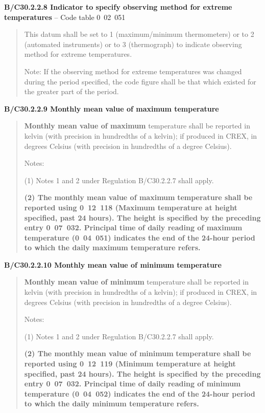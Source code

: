 \textbf{B/C30.2.2.8 Indicator to specify observing method for extreme temperatures} -- Code table 0~02~051

\begin{quote}
This datum shall be set to 1 (maximum/minimum thermometers) or to 2 (automated instruments) or to 3 (thermograph) to indicate observing method for extreme temperatures.

Note: If the observing method for extreme temperatures was changed during the period specified, the code figure shall be that which existed for the greater part of the period.
\end{quote}

\textbf{B/C30.2.2.9 Monthly mean value of maximum temperature}

\begin{quote}
\textbf{Monthly mean value of maximum} temperature shall be reported in kelvin (with precision in hundredths of a kelvin); if produced in CREX, in degrees Celsius (with precision in hundredths of a degree Celsius).

Notes:

(1) Notes 1 and 2 under Regulation B/C30.2.2.7 shall apply.

\textbf{(2) The monthly mean value of maximum} \textbf{temperature shall be reported using 0~12~118 (Maximum temperature at height specified, past 24 hours). The height is specified by the preceding entry 0~07~032. Principal time of daily reading of maximum} \textbf{temperature (0~04~051) indicates the end of the 24-hour period to which the daily maximum temperature refers.}
\end{quote}

\textbf{B/C30.2.2.10 Monthly mean value of minimum temperature}

\begin{quote}
\textbf{Monthly mean value of minimum} temperature shall be reported in kelvin (with precision in hundredths of a kelvin); if produced in CREX, in degrees Celsius (with precision in hundredths of a degree Celsius).

Notes:

(1) Notes 1 and 2 under Regulation B/C30.2.2.7 shall apply.

\textbf{(2) The monthly mean value of minimum} \textbf{temperature shall be reported using 0~12~119 (Minimum temperature at height specified, past 24 hours). The height is specified by the preceding entry 0~07~032. Principal time of daily reading of minimum} \textbf{temperature (0~04~052) indicates the end of the 24-hour period to which the daily minimum temperature refers.}
\end{quote}

